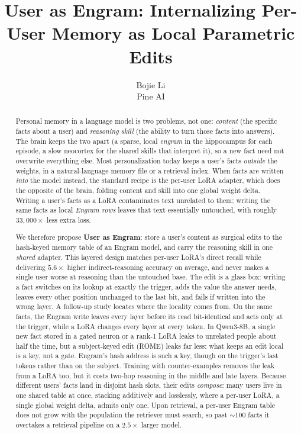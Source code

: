 \documentclass[11pt]{article}
\title{User as Engram: Internalizing Per-User Memory as Local Parametric Edits}
\author{%
	Bojie Li \\
	Pine AI
}
\date{}
\begin{document}
\maketitle

\begin{abstract}
Personal memory in a language model is two problems, not one:
\emph{content} (the specific facts about a user) and
\emph{reasoning skill} (the ability to turn those facts into
answers). The brain keeps the two apart (a sparse, local
\emph{engram} in the hippocampus for each episode, a slow neocortex
for the shared skills that interpret it), so a new fact need not
overwrite everything else. Most personalization today keeps a
user's facts \emph{outside} the weights, in a natural-language
memory file or a retrieval index. When facts are written
\emph{into} the model instead, the standard recipe is the per-user
LoRA adapter, which does the opposite of the brain, folding
content and skill into one global weight delta.
Writing a user's facts as a LoRA contaminates text unrelated to them;
writing the same facts as local \emph{Engram rows} leaves that text
essentially untouched, with roughly $33{,}000\times$ less extra loss.

We therefore propose \textbf{User as Engram}: store a user's
content as surgical edits to the hash-keyed memory table of an
Engram model, and carry the reasoning skill in one \emph{shared}
adapter. This layered
design matches per-user LoRA's direct recall while delivering
$5.6\times$ higher indirect-reasoning accuracy on average,
and never makes a single user worse at reasoning than
the untouched base. The edit is a glass box: writing a fact switches
on its lookup at exactly the trigger, adds the value the answer needs,
leaves every other position unchanged to the last bit, and fails if
written into the wrong layer.
A follow-up study locates where the locality comes from. On the same
facts, the Engram write leaves every layer before its read bit-identical
and acts only at the trigger, while a LoRA changes every layer at every
token. In Qwen3-8B, a single new fact stored in a gated neuron or a
rank-1 LoRA leaks to unrelated people about half the time, but a
subject-keyed edit (ROME) leaks far less: what keeps an edit
local is a key, not a gate. Engram's hash address is such a key,
though on the trigger's last tokens rather than on the subject.
Training with counter-examples removes the leak from a LoRA too, but it costs two-hop reasoning in the middle and late layers.
Because different users' facts land in disjoint hash slots, their edits
\emph{compose}: many users live in one shared table at once, stacking
additively and losslessly, where a per-user LoRA, a single global
weight delta, admits only one.
Upon retrieval, a per-user Engram table does not grow with the
population the retriever must search, so past $\sim$100 facts it overtakes a retrieval pipeline on a
$2.5\times$ larger model.
\end{abstract}
\end{document}
